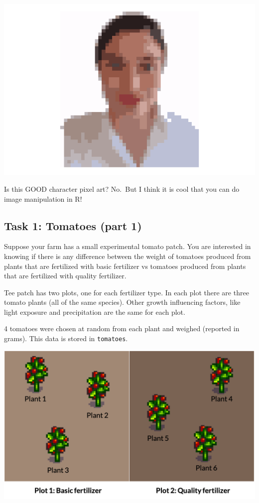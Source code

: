 \documentclass[
  openany]{book}
\begin{document}
\begin{center}\includegraphics[width=0.5\linewidth]{images/m3/lb-example} \end{center}

Is this GOOD character pixel art? No.~But I think it is cool that you can do image manipulation in R!

\hypertarget{task-1-tomatoes-part-1}{%
\subsection{Task 1: Tomatoes (part 1)}\label{task-1-tomatoes-part-1}}

Suppose your farm has a small experimental tomato patch. You are interested in knowing if there is any difference between the weight of tomatoes produced from plants that are fertilized with basic fertilizer vs tomatoes produced from plants that are fertilized with quality fertilizer.

Tee patch has two plots, one for each fertilizer type. In each plot there are three tomato plants (all of the same species). Other growth influencing factors, like light exposure and precipitation are the same for each plot.

4 tomatoes were chosen at random from each plant and weighed (reported in grams). This data is stored in \texttt{tomatoes}.

\begin{center}\includegraphics[width=1\linewidth]{images/m3/tomatoplot} \end{center}
\end{document}
